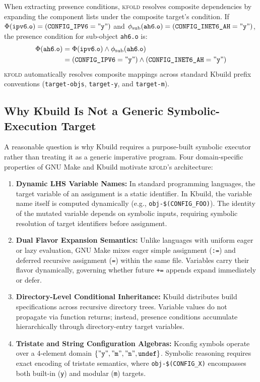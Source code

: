 \documentclass[acmsmall,screen,review]{acmart}
\newcommand{\tool}{\textsc{kfold}\xspace}
\begin{document}
When extracting presence conditions, \tool resolves composite dependencies by expanding the component lists under the composite target's condition. If $\Phi(\mathtt{ipv6.o}) = (\texttt{CONFIG\_IPV6} = \mathtt{"y"})$ and $\phi_{\text{sub}}(\mathtt{ah6.o}) = (\texttt{CONFIG\_INET6\_AH} = \mathtt{"y"})$, the presence condition for sub-object \texttt{ah6.o} is:
\begin{align*}
\Phi(\mathtt{ah6.o}) &= \Phi(\mathtt{ipv6.o}) \wedge \phi_{\text{sub}}(\mathtt{ah6.o}) \\
&= (\texttt{CONFIG\_IPV6} = \mathtt{"y"}) \wedge (\texttt{CONFIG\_INET6\_AH} = \mathtt{"y"})
\end{align*}
\tool automatically resolves composite mappings across standard Kbuild prefix conventions (\texttt{target-objs}, \texttt{target-y}, and \texttt{target-m}).

\subsection{Why Kbuild Is Not a Generic Symbolic-Execution Target}
\label{sec:overview:why-different}

A reasonable question is why Kbuild requires a purpose-built symbolic executor rather than treating it as a generic imperative program. Four domain-specific properties of GNU Make and Kbuild motivate \tool's architecture:

\begin{enumerate}
\item \textbf{Dynamic LHS Variable Names:} In standard programming languages, the target variable of an assignment is a static identifier. In Kbuild, the variable name itself is computed dynamically (e.g., \texttt{obj-\$(CONFIG\_FOO)}). The identity of the mutated variable depends on symbolic inputs, requiring symbolic resolution of target identifiers before assignment.
\item \textbf{Dual Flavor Expansion Semantics:} Unlike languages with uniform eager or lazy evaluation, GNU Make mixes eager simple assignment (\texttt{:=}) and deferred recursive assignment (\texttt{=}) within the same file. Variables carry their flavor dynamically, governing whether future \texttt{+=} appends expand immediately or defer.
\item \textbf{Directory-Level Conditional Inheritance:} Kbuild distributes build specifications across recursive directory trees. Variable values do not propagate via function returns; instead, presence conditions accumulate hierarchically through directory-entry target variables.
\item \textbf{Tristate and String Configuration Algebras:} Kconfig symbols operate over a 4-element domain $\{ \mathtt{"y"}, \mathtt{"m"}, \mathtt{"n"}, \mathtt{undef} \}$. Symbolic reasoning requires exact encoding of tristate semantics, where \texttt{obj-\$(CONFIG\_X)} encompasses both built-in (\texttt{y}) and modular (\texttt{m}) targets.
\end{enumerate}
\end{document}
